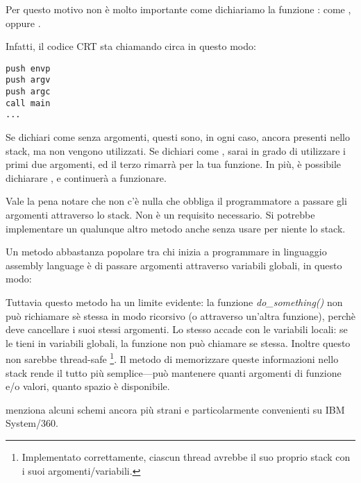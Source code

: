 \par
Per questo motivo non è molto importante come dichiariamo la funzione \main: come \main, \\
 oppure .

Infatti, il codice \ac{CRT} sta chiamando \main circa in questo modo:

\begin{lstlisting}[style=customasmx86]
push envp
push argv
push argc
call main
...
\end{lstlisting}

Se dichiari \main come \main senza argomenti, questi sono, in ogni caso, ancora presenti nello stack, ma non vengono utilizzati.
Se dichiari \main come ,
sarai in grado di utilizzare i primi due argomenti, ed il terzo rimarrà  per la tua funzione.
In più, è possibile dichiarare , e continuerà a funzionare.


Vale la pena notare che non c'è nulla che obbliga il programmatore a passare gli argomenti attraverso lo stack. Non è un requisito necessario.
Si potrebbe implementare un qualunque altro metodo anche senza usare per niente lo stack.

Un metodo abbastanza popolare tra chi inizia a programmare in linguaggio assembly language è di passare argomenti attraverso variabili globali, in questo modo:



Tuttavia questo metodo ha un limite evidente: la funzione \emph{do\_something()} non può richiamare sè stessa in modo ricorsivo (o attraverso un'altra funzione),
perchè deve cancellare i suoi stessi argomenti.
Lo stesso accade con le variabili locali: se le tieni in variabili globali, la funzione non può chiamare se stessa.
Inoltre questo non sarebbe thread-safe
\footnote{Implementato correttamente, ciascun thread avrebbe il suo proprio stack con i suoi argomenti/variabili.}.
Il metodo di memorizzare queste informazioni nello stack rende il tutto più semplice---può mantenere quanti argomenti di funzione e/o valori,
quanto spazio è disponibile.

 menziona alcuni schemi ancora più strani e particolarmente convenienti su IBM System/360.


